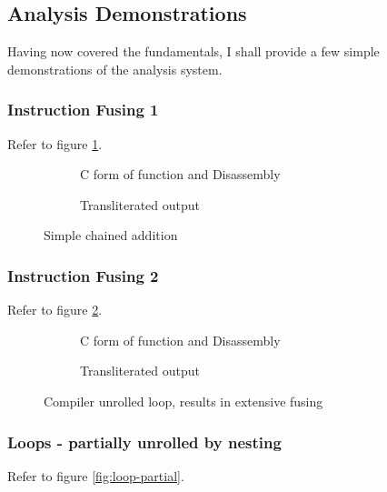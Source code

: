 \documentclass[a4paper]{article}
\begin{document}
\subsection{Analysis Demonstrations}

Having now covered the fundamentals, I shall provide a few simple demonstrations of the analysis system.

\subsubsection{Instruction Fusing 1}
Refer to figure \ref{fig:if1}.

\begin{figure}
  \begin{subfigure}[b]{0.5\textwidth}
    
    
    \caption{C form of function and Disassembly}
  \end{subfigure}
  \begin{subfigure}[b]{0.5\textwidth}
    
    \caption{Transliterated output}
  \end{subfigure}
  \caption{Simple chained addition}
  \label{fig:if1}
\end{figure}

\subsubsection{Instruction Fusing 2}
Refer to figure \ref{fig:if2}.

\begin{figure}
  \begin{subfigure}[b]{0.5\textwidth}
    
    
    \caption{C form of function and Disassembly}
  \end{subfigure}
  \begin{subfigure}[b]{0.5\textwidth}
    
    \caption{Transliterated output}
  \end{subfigure}
  \caption{Compiler unrolled loop, results in extensive fusing}
  \label{fig:if2}
\end{figure}

\subsubsection{Loops - partially unrolled by nesting}
Refer to figure \ref{fig:loop-partial}.
\end{document}
